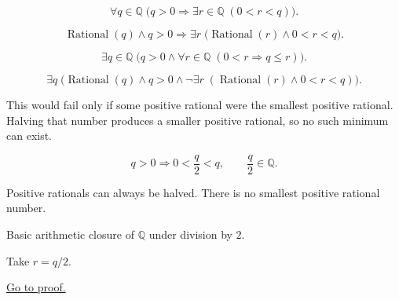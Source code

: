 \begin{remark*}
\[
\forall q\in\mathbb{Q}\;
\bigl(q>0 \Longrightarrow \exists r\in\mathbb{Q}\;(0<r<q)\bigr).
\]
\end{remark*}

\begin{remark*}
\[
\operatorname{Rational}(q)\land q>0
\Longrightarrow
\exists r\;\bigl(\operatorname{Rational}(r)\land 0<r<q\bigr).
\]
\end{remark*}

\begin{remark*}
\[
\exists q\in\mathbb{Q}\;
\bigl(q>0 \land \forall r\in\mathbb{Q}\;(0<r \Longrightarrow q\le r)\bigr).
\]
\end{remark*}

\begin{remark*}
\[
\exists q\;\bigl(\operatorname{Rational}(q)\land q>0 \land
\neg\exists r\;(\operatorname{Rational}(r)\land 0<r<q)\bigr).
\]
\end{remark*}

\begin{remark*}
This would fail only if some positive rational were the smallest positive
rational. Halving that number produces a smaller positive rational, so no such
minimum can exist.
\end{remark*}

\begin{remark*}
\[
q>0
\Longrightarrow
0<\frac{q}{2}<q,
\qquad
\frac{q}{2}\in\mathbb{Q}.
\]
\end{remark*}

\begin{remark*}[Interpretation]
Positive rationals can always be halved.  There is no smallest positive
rational number.
\end{remark*}

\begin{remark*}[Dependencies]
Basic arithmetic closure of $\mathbb{Q}$ under division by $2$.
\end{remark*}

\begin{remark*}
Take $r=q/2$.
\end{remark*}

\begin{remark*}[Proof]
\hyperref[prf:q-has-no-minimum-positive-element]{Go to proof.}
\end{remark*}

